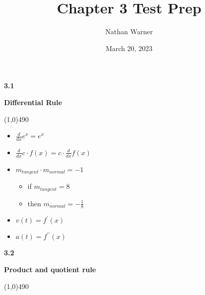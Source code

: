 \documentclass{report}
\title{\Huge{Chapter 3 Test Prep}}
\author{\huge{Nathan Warner}}
\date{\huge{March 20, 2023}}
\begin{document}
    \maketitle
    \pagebreak \bigbreak \noindent
    \begin{Large}
        \begin{mdframed}
            \begin{center}
                \textbf{3.1}
            \end{center}
        \end{mdframed}
    \end{Large}
    \begin{Large}
        \begin{center}
            \textbf{Differential Rule}
        \end{center}
    \end{Large}
    \line(1,0){490}
    
    \bigbreak \noindent 
    \begin{mdframed}
        \begin{itemize}
           \item $\frac{d}{dx}e^{x} = e^{x}$ 
            \item $\frac{d}{dx}c \cdot f(x) = c \cdot \frac{d}{dx}f(x)$ 
            \item $m_{tangent} \cdot m_{normal} = -1 $
                \begin{itemize}
                    \item if $m_{tangent} = 8$
                    \item then  $m_{normal} = -\frac{1}{8}$
                \end{itemize}
            \item $v(t) = f^{\prime}(x)$
            \item $a(t) = f^{\prime\prime}(x)$ 
        \end{itemize}
    \end{mdframed}

    \bigbreak \noindent
    \begin{Large}
        \begin{mdframed}
            \begin{center}
                \textbf{3.2}
            \end{center}
        \end{mdframed}
    \end{Large}
    \begin{Large}
        \begin{center}
            \textbf{Product and quotient rule}
        \end{center}
    \end{Large}
    \line(1,0){490}
\end{document}
